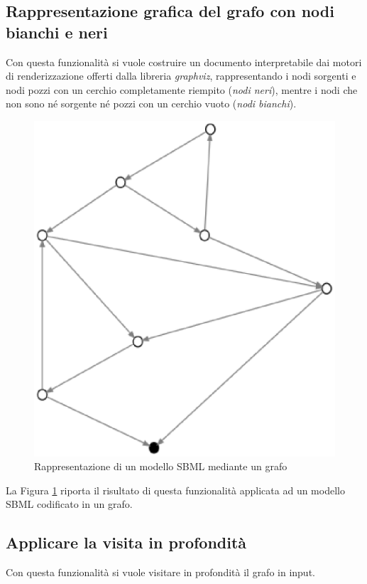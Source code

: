 \subsection{Rappresentazione grafica del grafo con nodi bianchi e
  neri}
\label{subsection:represent-it-in-black-and-white}
Con questa funzionalit\`a si vuole costruire un documento
interpretabile dai motori di renderizzazione offerti dalla libreria
\emph{graphviz}, rappresentando i nodi sorgenti e nodi pozzi con un
cerchio completamente riempito (\emph{nodi neri}), mentre i nodi che
non sono n\'e sorgente n\'e pozzi con un cerchio vuoto (\emph{nodi
  bianchi}).
\begin{figure}
  \centering
  \includegraphics[scale=0.8]{images/applicationOfPrinterPipeFilterOnTarjanModel-phase-PrinterPipeFilter-level-0.eps}
  \caption{Rappresentazione di un modello SBML mediante un grafo}
  \label{fig:simple-black-and-white}
\end{figure}

La Figura \ref{fig:simple-black-and-white} riporta il risultato di
questa funzionalit\`a applicata ad un modello SBML codificato in un
grafo.

\subsection{Applicare la visita in profondit\`a}
Con questa funzionalit\`a si vuole visitare in profondit\`a il grafo
in input.

